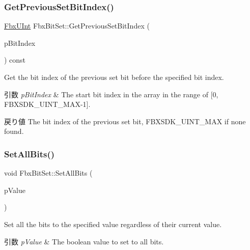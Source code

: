 \subsubsection{\texorpdfstring{Get\+Previous\+Set\+Bit\+Index()}{GetPreviousSetBitIndex()}}
{\footnotesize\ttfamily \hyperlink{fbxtypes_8h_ae9fb141d8158a730aa85ec5ff2ea3f6b}{Fbx\+U\+Int} Fbx\+Bit\+Set\+::\+Get\+Previous\+Set\+Bit\+Index (\begin{DoxyParamCaption}\item[{const \hyperlink{fbxtypes_8h_ae9fb141d8158a730aa85ec5ff2ea3f6b}{Fbx\+U\+Int}}]{p\+Bit\+Index }\end{DoxyParamCaption}) const}

Get the bit index of the previous set bit before the specified bit index. 
\begin{DoxyParams}{引数}
{\em p\+Bit\+Index} & The start bit index in the array in the range of \mbox{[}0, F\+B\+X\+S\+D\+K\+\_\+\+U\+I\+N\+T\+\_\+\+M\+A\+X-\/1\mbox{]}. \\
\hline
\end{DoxyParams}
\begin{DoxyReturn}{戻り値}
The bit index of the previous set bit, F\+B\+X\+S\+D\+K\+\_\+\+U\+I\+N\+T\+\_\+\+M\+AX if none found. 
\end{DoxyReturn}
\mbox{\label{class_fbx_bit_set_a1386fb2e41b67394008e63e445dc079e}} 
\subsubsection{\texorpdfstring{Set\+All\+Bits()}{SetAllBits()}}
{\footnotesize\ttfamily void Fbx\+Bit\+Set\+::\+Set\+All\+Bits (\begin{DoxyParamCaption}\item[{const bool}]{p\+Value }\end{DoxyParamCaption})}

Set all the bits to the specified value regardless of their current value. 
\begin{DoxyParams}{引数}
{\em p\+Value} & The boolean value to set to all bits. \\
\hline
\end{DoxyParams}
\mbox{\label{class_fbx_bit_set_a1aa861ea6719807763a3faf01d9a8fd5}} 
